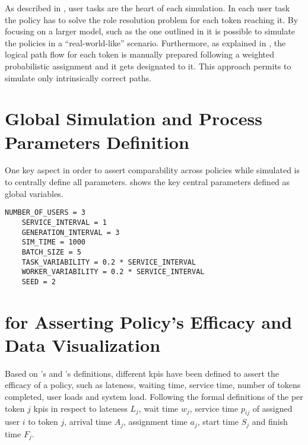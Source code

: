 
As described in , user tasks are the heart of each simulation. In each user task the policy has to solve the role resolution problem for each token reaching it. By focusing on a larger model, such as the one outlined in  it is possible to simulate the policies in a ``real-world-like'' scenario. Furthermore, as explained in , the logical path flow for each token is manually prepared following a weighted probabilistic assignment and it gets designated to it. This approach permits to simulate only intrinsically correct paths. 

\section{Global Simulation and Process Parameters Definition}

One key aspect in order to assert comparability across policies while simulated is to centrally define all parameters.  shows the key central parameters defined as global variables.

\begin{lstlisting}[caption=Global parameters definition that ensures comparability across simulation runs,label=lst:central_parameters,style=CustomPython]
	NUMBER_OF_USERS = 3
	SERVICE_INTERVAL = 1
	GENERATION_INTERVAL = 3
	SIM_TIME = 1000
	BATCH_SIZE = 5
	TASK_VARIABILITY = 0.2 * SERVICE_INTERVAL
	WORKER_VARIABILITY = 0.2 * SERVICE_INTERVAL
	SEED = 2
\end{lstlisting}

\section{ for Asserting Policy's Efficacy and Data Visualization}

Based on \citet{Pinedo2008}'s and \citet{Zeng2005}'s definitions, different \glspl{kpi} have been defined to assert the efficacy of a policy, such as lateness, waiting time, service time, number of tokens completed, user loads and system load. Following the formal definitions of the per token $j$ \glspl{kpi} in respect to lateness $L_j$, wait time $w_j$, service time $p_{ij}$ of assigned user $i$ to token $j$, arrival time $A_j$, assignment time $a_j$, start time $S_j$ and finish time $F_j$.

